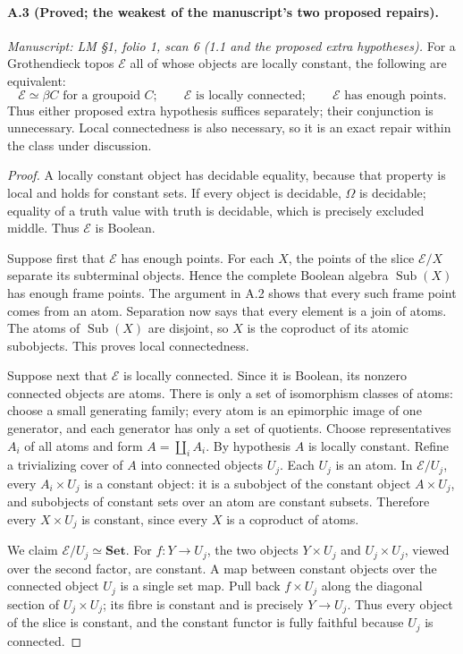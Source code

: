 \paragraph{A.3 (Proved; the weakest of the manuscript's two proposed repairs).}
\textit{Manuscript: LM \S1, folio 1, scan 6 (1.1 and the proposed extra hypotheses).}
For a Grothendieck topos $\mathcal E$ all of whose objects are locally constant, the following are equivalent:
\[
 \mathcal E\simeq\beta C\text{ for a groupoid }C;
 \qquad\mathcal E\text{ is locally connected};
 \qquad\mathcal E\text{ has enough points}.
\]
Thus either proposed extra hypothesis suffices separately; their conjunction is unnecessary. Local connectedness is also necessary, so it is an exact repair within the class under discussion.
\begin{proof}
A locally constant object has decidable equality, because that property is local and holds for constant sets. If every object is decidable, $\Omega$ is decidable; equality of a truth value with truth is decidable, which is precisely excluded middle. Thus $\mathcal E$ is Boolean.

Suppose first that $\mathcal E$ has enough points. For each $X$, the points of the slice $\mathcal E/X$ separate its subterminal objects. Hence the complete Boolean algebra $\operatorname{Sub}(X)$ has enough frame points. The argument in A.2 shows that every such frame point comes from an atom. Separation now says that every element is a join of atoms. The atoms of $\operatorname{Sub}(X)$ are disjoint, so $X$ is the coproduct of its atomic subobjects. This proves local connectedness.

Suppose next that $\mathcal E$ is locally connected. Since it is Boolean, its nonzero connected objects are atoms. There is only a set of isomorphism classes of atoms: choose a small generating family; every atom is an epimorphic image of one generator, and each generator has only a set of quotients. Choose representatives $A_i$ of all atoms and form $A=\coprod_i A_i$. By hypothesis $A$ is locally constant. Refine a trivializing cover of $A$ into connected objects $U_j$. Each $U_j$ is an atom. In $\mathcal E/U_j$, every $A_i\times U_j$ is a constant object: it is a subobject of the constant object $A\times U_j$, and subobjects of constant sets over an atom are constant subsets. Therefore every $X\times U_j$ is constant, since every $X$ is a coproduct of atoms.

We claim $\mathcal E/U_j\simeq\mathbf{Set}$. For $f:Y\to U_j$, the two objects $Y\times U_j$ and $U_j\times U_j$, viewed over the second factor, are constant. A map between constant objects over the connected object $U_j$ is a single set map. Pull back $f\times U_j$ along the diagonal section of $U_j\times U_j$; its fibre is constant and is precisely $Y\to U_j$. Thus every object of the slice is constant, and the constant functor is fully faithful because $U_j$ is connected.


\end{proof}
